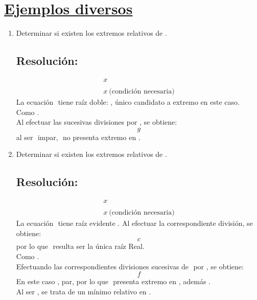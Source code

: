\documentclass[12pt]{article}
\begin{document}
\section*{\ul{Ejemplos diversos}}
\begin{enumerate}
  \item Determinar si existen los extremos relativos de $ $.

        \subsection*{Resolución:}
        $$
          \begin{array}{ccc}
            x \\
            \\
            x \ \text{(condición necesaria)}
          \end{array}
        $$
        La ecuación $ $ tiene raíz doble: $ $, único candidato a extremo en este caso.\\
        Como $ $.\\
        Al efectuar las sucesivas divisiones por $ $, se obtiene:
        $$
          g
        $$
        al ser $ $ impar, $ $ no presenta extremo en $ $.

  \item Determinar si existen los extremos relativos de $ $.

        \subsection*{Resolución:}
        $$
          \begin{array}{ccc}
            x \\
            \\
            x \ \text{(condición necesaria)}
          \end{array}
        $$
        La ecuación $ $ tiene raíz evidente $ $. Al efectuar la correspondiente división, se obtiene:
        $$
          c
        $$
        por lo que $ $ resulta ser la única raíz Real.\\
        Como $ $.\\
        Efectuando las correspondientes divisiones sucesivas de $ $ por $ $, se obtiene:
        $$
          f
        $$
        En este caso $ $, par, por lo que $ $ presenta extremo en $ $, además $ $.\\
        Al ser $ $, se trata de un mínimo relativo en $ $.


\end{enumerate}
\end{document}
